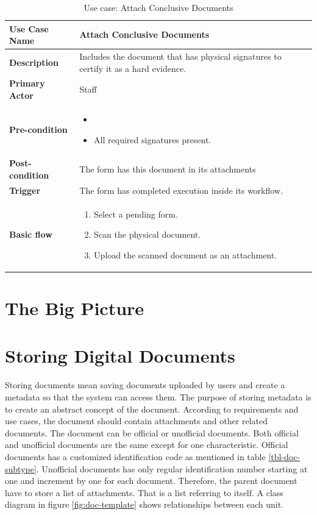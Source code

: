 \begin{table}
	\centering
	\caption{Use case: Attach Conclusive Documents}
	\label{tbl-usecase:attach-conclusive-documents}
	\begin{tabular}{|l|L{9cm}|}
		\hline
		\textbf{Use Case Name} & Attach Conclusive Documents \\
		\hline
		
		\textbf{Description} & Includes the document that has physical signatures to certify it as a hard evidence. \\
		\textbf{Primary Actor} & Staff \\
		\textbf{Pre-condition} & 
		\begin{itemize}
			\item \alreadylogin
			\item All required signatures present.
		\end{itemize} \\
		
		\textbf{Post-condition} & The form has this document in its attachments \\
		\textbf{Trigger} & The form has completed execution inside its workflow. \\
		\textbf{Basic flow} & 
		\begin{enumerate}
			\item Select a pending form.
			\item Scan the physical document.
			\item Upload the scanned document as an attachment.
		\end{enumerate} \\
		\hline
	\end{tabular}
\end{table}

\section{The Big Picture}


\section{Storing Digital Documents}
Storing documents mean saving documents uploaded by users and create a metadata so that the system can access them.
The purpose of storing metadata is to create an abstract concept of the document.
According to requirements and use cases, the document should contain attachments and other related documents.
The document can be official or unofficial documents.
Both official and unofficial documents are the same except for one characteristic.
Official documents has a customized identification code as mentioned in table \ref{tbl-doc-subtype}.
Unofficial documents has only regular identification number starting at one and increment by one for each document.
Therefore, the parent document have to store a list of attachments.
That is a list referring to itself.
A class diagram in figure \ref{fig:doc-template} shows relationships between each unit.


